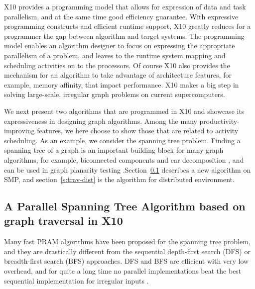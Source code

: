  X10 provides a programming model that allows for expression of data and task parallelism,  and at the same time good efficiency guarantee. With expressive programming constructs and efficient runtime support, X10 greatly reduces for a programmer the gap between algorithm and target systems. The programming model enables an algorithm designer to focus on expressing the appropriate parallelism of a problem, and leaves to the runtime system mapping and scheduling activities on to the processors. Of course X10 also provides the mechanism for an algorithm to take advantage of architecture features, for example, memory affinity, that impact performance. X10 makes a big step in solving large-scale, irregular graph problems on current supercomputers.


 We next present two algorithms that are programmed in X10 and showcase its expressiveness in designing graph algorithms. Among the many productivity-improving features, we here choose to show those that are related to activity scheduling. 
As an example, we consider the spanning tree problem. Finding a spanning tree of a graph is an important building
block for many graph algorithms, for example, biconnected components
and ear decomposition \cite{MR86}, and can be used in graph planarity
testing \cite{KR88}.Section~\ref{s:trav} describes a new algorithm on SMP, and section~\ref{s:trav-dist} is the algorithm
for distributed environment.


 

\subsection{A Parallel Spanning Tree Algorithm based on graph traversal in X10}
\label{s:trav}

Many fast PRAM algorithms have been proposed for the spanning tree problem, and they 
are drastically different from the sequential depth-first search (DFS) or breadth-first search (BFS) approaches.
DFS and BFS are efficient with very low overhead, and for quite a long time no parallel implementations beat the
best sequential implementation for irregular inputs \cite{BC04a}. 

